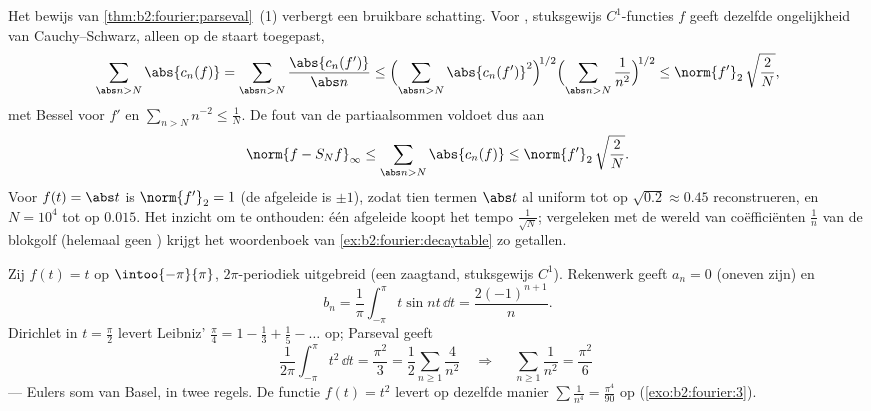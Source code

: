 \begin{example}\label{ex:b2:fourier:tailbound}
Het bewijs van \cref{thm:b2:fourier:parseval}~(1) verbergt een
bruikbare schatting. Voor , stuksgewijs $C^1$-functies $f$
geeft dezelfde ongelijkheid van Cauchy--Schwarz, alleen op de
staart toegepast,
\[
\sum_{\abs n > N}\abs{c_n(f)}
= \sum_{\abs n > N}\frac{\abs{c_n(f')}}{\abs n}
\leq \Bigl(\sum_{\abs n > N}\abs{c_n(f')}^2\Bigr)^{\!1/2}
\Bigl(\sum_{\abs n>N}\frac{1}{n^2}\Bigr)^{\!1/2}
\leq \norm{f'}_2\,\sqrt{\frac{2}{N}} ,
\]
met Bessel voor $f'$ en $\sum_{n>N}n^{-2} \leq \frac1N$. De
 fout van de partiaalsommen voldoet dus aan
\[
\norm{f - S_Nf}_\infty
\leq \sum_{\abs n>N}\abs{c_n(f)}
\leq \norm{f'}_2\,\sqrt{\frac2N} .
\]
Voor $f(t) = \abs t$ is $\norm{f'}_2 = 1$ (de afgeleide is
$\pm1$), zodat tien termen $\abs t$ al uniform tot op $\sqrt{0.2}
\approx 0.45$ reconstrueren, en $N = 10^4$ tot op $0.015$. Het
inzicht om te onthouden: één afgeleide koopt het  tempo
$\frac{1}{\sqrt N}$; vergeleken met de wereld van coëfficiënten
$\frac1n$ van de blokgolf (helemaal geen )
krijgt het woordenboek van \cref{ex:b2:fourier:decaytable} zo
getallen.
\end{example}

\begin{example}\label{ex:b2:fourier:basel}
Zij $f(t) = t$ op $\intoo{-\pi}{\pi}$, $2\pi$-periodiek uitgebreid
(een zaagtand, stuksgewijs $C^1$). Rekenwerk geeft $a_n = 0$
(oneven zijn) en
\[
b_n = \frac{1}{\pi}\int_{-\pi}^{\pi} t\sin nt\,\dd t
= \frac{2(-1)^{n+1}}{n} .
\]
Dirichlet in $t = \frac\pi2$ levert Leibniz' $\frac\pi4 = 1 -
\frac13 + \frac15 - \dots$ op; Parseval geeft
\[
\frac{1}{2\pi}\int_{-\pi}^{\pi} t^2\,\dd t = \frac{\pi^2}{3}
= \frac12\sum_{n\geq1}\frac{4}{n^2}
\quad\Longrightarrow\quad
\boxed{\;\sum_{n\geq1}\frac{1}{n^2} = \frac{\pi^2}{6}\;}
\]
--- Eulers som van Basel, in twee regels. De functie $f(t) = t^2$
levert op dezelfde manier $\sum \frac1{n^4} = \frac{\pi^4}{90}$ op
(\cref{exo:b2:fourier:3}).
\end{example}

